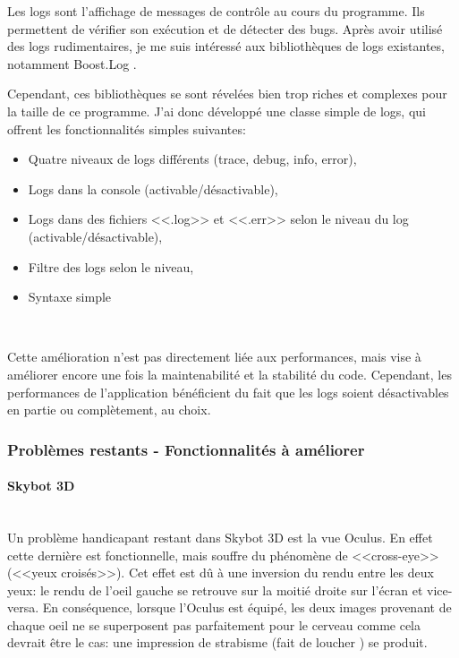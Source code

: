 \documentclass[a4paper,french,12pt]{article}
\begin{document}
	Les logs sont l'affichage de messages de contrôle au cours du programme. Ils permettent de vérifier son exécution
	et de détecter des bugs.
	Après avoir utilisé des logs rudimentaires, je me suis intéressé aux bibliothèques de logs existantes, notamment Boost.Log .
	
	Cependant, ces bibliothèques se sont révelées bien trop riches et complexes pour la taille de ce programme.
	J'ai donc développé une classe simple de logs, qui offrent les fonctionnalités simples suivantes:
	
	\begin{itemize}
	 \item Quatre niveaux de logs différents (trace, debug, info, error),
	 \item Logs dans la console (activable/désactivable),
	 \item Logs dans des fichiers <<.log>> et <<.err>> selon le niveau du log (activable/désactivable),
	 \item Filtre des logs selon le niveau,
	 \item Syntaxe simple
	\end{itemize}~
	
	Cette amélioration n'est pas directement liée aux performances, mais vise à améliorer encore une fois la maintenabilité
	et la stabilité du code.
	Cependant, les performances de l'application bénéficient du fait que les logs soient désactivables en partie ou complètement, au choix.
	
    \subsubsection{Problèmes restants - Fonctionnalités à améliorer}
      \paragraph{Skybot 3D}~\\
	\label{cross_eye}
	Un problème handicapant restant dans Skybot 3D est la vue Oculus.
	En effet cette dernière est fonctionnelle, mais souffre du phénomène de <<cross-eye>> (<<yeux croisés>>).
	Cet effet est dû à une inversion du rendu entre les deux yeux: le rendu de l'oeil gauche se retrouve sur la moitié  droite sur
	l'écran et vice-versa.
	En conséquence, lorsque l'Oculus est équipé, les deux images provenant de chaque oeil ne se superposent pas
	parfaitement pour le cerveau comme cela devrait être le cas: une impression de strabisme (fait de loucher ) se produit.
\end{document}
